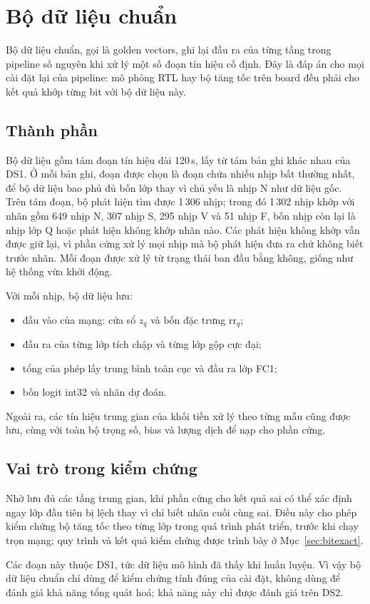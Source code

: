 \section{Bộ dữ liệu chuẩn}\label{sec:golden}

Bộ dữ liệu chuẩn, gọi là golden vectors, ghi lại đầu ra của từng tầng trong pipeline số nguyên khi xử lý một số đoạn tín hiệu cố định.
Đây là đáp án cho mọi cài đặt lại của pipeline: mô phỏng RTL hay bộ tăng tốc trên board đều phải cho kết quả khớp từng bit với bộ dữ liệu này.

\subsection{Thành phần}

Bộ dữ liệu gồm tám đoạn tín hiệu dài 120\,s, lấy từ tám bản ghi khác nhau của DS1.
Ở mỗi bản ghi, đoạn được chọn là đoạn chứa nhiều nhịp bất thường nhất, để bộ dữ liệu bao phủ đủ bốn lớp thay vì chủ yếu là nhịp N như dữ liệu gốc.
Trên tám đoạn, bộ phát hiện tìm được 1\,306 nhịp; trong đó 1\,302 nhịp khớp với nhãn gồm 649 nhịp N, 307 nhịp S, 295 nhịp V và 51 nhịp F, bốn nhịp còn lại là nhịp lớp Q hoặc phát hiện không khớp nhãn nào.
Các phát hiện không khớp vẫn được giữ lại, vì phần cứng xử lý mọi nhịp mà bộ phát hiện đưa ra chứ không biết trước nhãn.
Mỗi đoạn được xử lý từ trạng thái ban đầu bằng không, giống như hệ thống vừa khởi động.

Với mỗi nhịp, bộ dữ liệu lưu:
\begin{itemize}
  \item đầu vào của mạng: cửa sổ $z_q$ và bốn đặc trưng $\mathrm{rr}_q$;
  \item đầu ra của từng lớp tích chập và từng lớp gộp cực đại;
  \item tổng của phép lấy trung bình toàn cục và đầu ra lớp FC1;
  \item bốn logit int32 và nhãn dự đoán.
\end{itemize}
Ngoài ra, các tín hiệu trung gian của khối tiền xử lý theo từng mẫu cũng được lưu, cùng với toàn bộ trọng số, bias và lượng dịch để nạp cho phần cứng.

\subsection{Vai trò trong kiểm chứng}

Nhờ lưu đủ các tầng trung gian, khi phần cứng cho kết quả sai có thể xác định ngay lớp đầu tiên bị lệch thay vì chỉ biết nhãn cuối cùng sai.
Điều này cho phép kiểm chứng bộ tăng tốc theo từng lớp trong quá trình phát triển, trước khi chạy trọn mạng; quy trình và kết quả kiểm chứng được trình bày ở Mục~\ref{sec:bitexact}.

Các đoạn này thuộc DS1, tức dữ liệu mô hình đã thấy khi huấn luyện.
Vì vậy bộ dữ liệu chuẩn chỉ dùng để kiểm chứng tính đúng của cài đặt, không dùng để đánh giá khả năng tổng quát hoá; khả năng này chỉ được đánh giá trên DS2.
